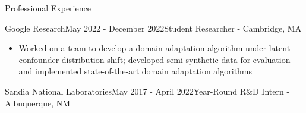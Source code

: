 \documentclass[11pt]{resume} %
\begin{document}
\begin{rSection}{Professional Experience}
\begin{rSubsection}{Google Research}{May 2022 - December 2022}{Student Researcher - Cambridge, MA}

\begin{itemize}[label={}]
    \setlength\itemsep{0em}
    \item Worked on a team to develop a domain adaptation algorithm under latent confounder distribution shift;
    developed semi-synthetic data for evaluation and implemented state-of-the-art domain adaptation algorithms
\end{itemize}

\end{rSubsection}

\begin{rSubsection}{Sandia National Laboratories}{May 2017 - April 2022}{Year-Round R\&D Intern - Albuquerque, NM}


\end{rSubsection}
\end{rSection}
\end{document}
